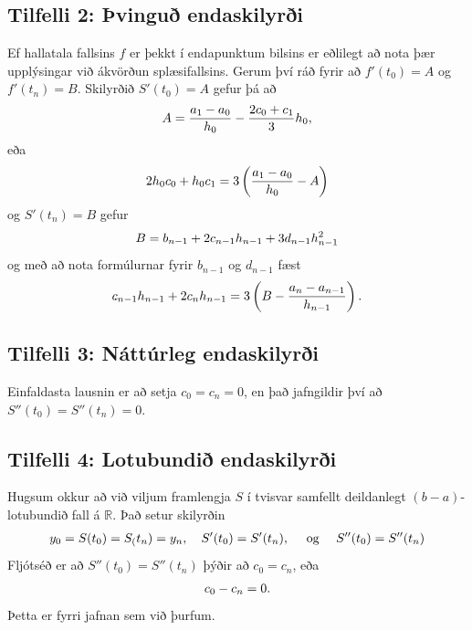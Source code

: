 \documentclass[letterpaper,10pt,icelandic]{sphinxmanual}
\begin{document}
\subsection{Tilfelli 2: Þvinguð endaskilyrði}
\label{kafli03:tilfelli-2-vingu-endaskilyri}
Ef hallatala fallsins \(f\) er þekkt í endapunktum bilsins er
eðlilegt að nota þær upplýsingar við ákvörðun splæsifallsins. Gerum því
ráð fyrir að \(f'(t_0) = A\) og \(f'(t_n) = B\). Skilyrðið
\(S'(t_0) = A\) gefur þá að
\begin{gather}
\begin{split}A = \frac{a_1-a_0}{h_0} - \frac{2c_0+c_1}{3}h_0,\end{split}\notag
\end{gather}
eða
\begin{gather}
\begin{split}2h_0c_0 + h_0c_1 =
    3 \left( \frac{a_1-a_0}{h_0} - A \right)\end{split}\notag
\end{gather}
og \(S'(t_n) = B\) gefur
\begin{gather}
\begin{split}B = b_{n-1} + 2c_{n-1}h_{n-1} + 3d_{n-1}h_{n-1}^2\end{split}\notag
\end{gather}
og með að nota formúlurnar fyrir \(b_{n-1}\) og \(d_{n-1}\)
fæst
\begin{gather}
\begin{split}c_{n-1}h_{n-1} + 2c_nh_{n-1} =
    3 \left( B  - \frac{a_n-a_{n-1}}{h_{n-1}} \right).\end{split}\notag
\end{gather}

\subsection{Tilfelli 3: Náttúrleg endaskilyrði}
\label{kafli03:tilfelli-3-natturleg-endaskilyri}
Einfaldasta lausnin er að setja \(c_0 = c_n = 0\), en það jafngildir
því að \(S''(t_0) = S''(t_n) = 0\).


\subsection{Tilfelli 4: Lotubundið endaskilyrði}
\label{kafli03:tilfelli-4-lotubundi-endaskilyri}
Hugsum okkur að við viljum framlengja \(S\) í tvisvar samfellt
deildanlegt \((b-a)\)-lotubundið fall á \({{\mathbb  R}}\). Það
setur skilyrðin
\begin{gather}
\begin{split}y_0 = S(t_0) = S_(t_n) = y_n, \quad
    S'(t_0) = S'(t_n), \quad
    \text{ og } \quad
    S''(t_0) = S''(t_n)\end{split}\notag
\end{gather}
Fljótséð er að \(S''(t_0) = S''(t_n)\) þýðir að \(c_0 = c_n\),
eða
\begin{gather}
\begin{split}c_0 - c_n = 0.\end{split}\notag
\end{gather}
Þetta er fyrri jafnan sem við þurfum.
\end{document}

